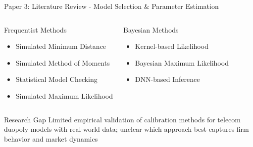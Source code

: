 \documentclass[10pt,aspectratio=169]{beamer}
\begin{document}
\begin{frame}{Paper 3: Literature Review - Model Selection \& Parameter Estimation}



\begin{columns}
    \begin{block}{Frequentist Methods}
    \begin{itemize}
        \item Simulated Minimum Distance \citep{Grazzini2015EstimationDistance}
        \item Simulated Method of Moments \citep{Grazzini2015EstimationDistance}
        \item Statistical Model Checking \citep{Vandin2022AutomatedModels}
        \item Simulated Maximum Likelihood \citep{Kukacka2023EstimationModels}
    \end{itemize}
    \end{block}

    \begin{block}{Bayesian Methods}
    \begin{itemize}
        \item Kernel-based Likelihood \citep{DelliGatti2020RisingModels}
        \item Bayesian Maximum Likelihood \citep{Gao2022BehavioralApproach}
        \item DNN-based Inference \citep{Platt2022BayesianNetworks}
    \end{itemize}
    \end{block}

\end{columns}

\vspace{2mm}
\begin{alertblock}{Research Gap}
Limited empirical validation of calibration methods for telecom duopoly models with real-world data; unclear which approach best captures firm behavior and market dynamics
\end{alertblock}

\end{frame}
\end{document}

